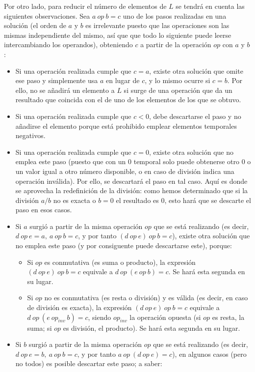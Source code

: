 \documentclass{article}
\begin{document}
Por otro lado, para reducir el número de elementos de $L$ se tendrá en cuenta las siguientes observaciones. Sea $a\ op\ b = c$ uno de los pasos realizadas en una solución (el orden de $a$ y $b$ es irrelevante puesto que las operaciones son las mismas independiente del mismo, así que que todo lo siguiente puede leerse intercambiando los operandos), obteniendo $c$ a partir de la operación $op$ con $a$ y $b$:

\begin{itemize}
	\item Si una operación realizada cumple que $c=a$, existe otra solución que omite ese paso y simplemente usa $a$ en lugar de $c$, y lo mismo ocurre si $c=b$. Por ello, no se añadirá un elemento a $L$ si surge de una operación que da un resultado que coincida con el de uno de los elementos de los que se obtuvo.
	\item Si una operación realizada cumple que $c < 0$, debe descartarse el paso y no añadirse el elemento porque está prohibido emplear elementos temporales negativos.
	\item Si una operación realizada cumple que $c = 0$, existe otra solución que no emplea este paso (puesto que con un $0$ temporal solo puede obtenerse otro $0$ o un valor igual a otro número disponible, o en caso de división indica una operación inválida). Por ello, se descartará el paso en tal caso. Aquí es donde se aprovecha la redefinición de la división: como hemos determinado que si la división $a/b$ no es exacta o $b=0$ el resultado es $0$, esto hará que se descarte el paso en esos casos.
	\item Si $a$ surgió a partir de la misma operación $op$ que se está realizando (es decir, $d\ op\ e = a,\ a\ op\ b = c$, y por tanto $(d\ op\ e)\ op\ b = c$), existe otra solución que no emplea este paso (y por consiguente puede descartarse este), porque:
	\begin{itemize}
		\item Si $op$ es conmutativa (es suma o producto), la expresión $(d\ op\ e)\ op\ b = c$ equivale a $d\ op\ (e\ op\ b) = c$. Se hará esta segunda en su lugar.
		\item Si $op$ no es conmutativa (es resta o división) y es válida (es decir, en caso de división es exacta), la expresión $(d\ op\ e)\ op\ b = c$ equivale a $d\ op\ (e\ op_{inv}\ b) = c$, siendo $op_{inv}$ la operación opuesta (si $op$ es resta, la suma; si $op$ es división, el producto). Se hará esta segunda en su lugar.
	\end{itemize}
	\item Si $b$ surgió a partir de la misma operación $op$ que se está realizando (es decir, $d\ op\ e = b,\ a\ op\ b = c$, y por tanto $a\ op\ (d\ op\ e) = c$), en algunos casos (pero no todos) es posible descartar este paso; a saber:

\end{itemize}
\end{document}
